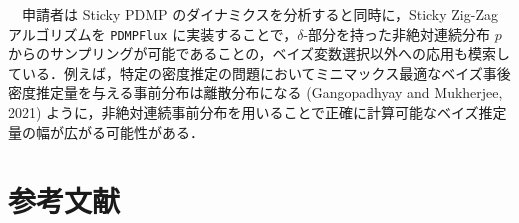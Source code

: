 \documentclass[
]{article}
\theoremstyle{StatementsWithUnderline}\newtheorem{theorem}{定理}[section]\newtheorem{definition}[theorem]{定義}\newtheorem{corollary}[theorem]{系}\newtheorem{proposition}[theorem]{命題}\newtheorem{lemma}[theorem]{補題}\newtheorem{example}[theorem]{例}
\theoremstyle{definition}\newtheorem{notation}[theorem]{記法}\newtheorem{algorithm}[theorem]{算譜}\newtheorem{remarks}[theorem]{要諦}\newtheorem{remark}[theorem]{注}
\begin{document}
　申請者は Sticky PDMP のダイナミクスを分析すると同時に，Sticky Zig-Zag
アルゴリズムを \texttt{PDMPFlux}
に実装することで，\(\delta\)-部分を持った非絶対連続分布 \(p\)
からのサンプリングが可能であることの，ベイズ変数選択以外への応用も模索している．例えば，特定の密度推定の問題においてミニマックス最適なベイズ事後密度推定量を与える事前分布は離散分布になる
(Gangopadhyay and Mukherjee, 2021)
ように，非絶対連続事前分布を用いることで正確に計算可能なベイズ推定量の幅が広がる可能性がある．

\section{参考文献}\label{ux53c2ux8003ux6587ux732e}

\setlength{\baselineskip}{1pt}

\label{refs}
\end{document}

